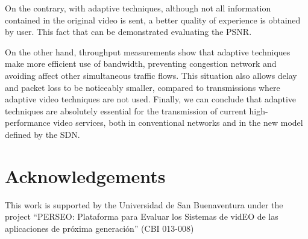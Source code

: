 On the contrary, with adaptive techniques, although not all information contained in the original video is sent, a better quality of experience is obtained by user. This fact that can be demonstrated evaluating the PSNR.

On the other hand, throughput measurements show that adaptive techniques make more efficient use of bandwidth, preventing congestion network and avoiding affect other simultaneous traffic flows. This situation also allows delay and packet loss to be noticeably smaller, compared to transmissions where adaptive video techniques are not used.
Finally, we can conclude that adaptive techniques are absolutely essential for the transmission of current high-performance video services, both in conventional networks and in the new model defined by the SDN.

\section*{Acknowledgements}
 This work is supported by the Universidad de San Buenaventura under the project “PERSEO: Plataforma para Evaluar los Sistemas de vidEO de las aplicaciones de próxima generación” (CBI 013-008)